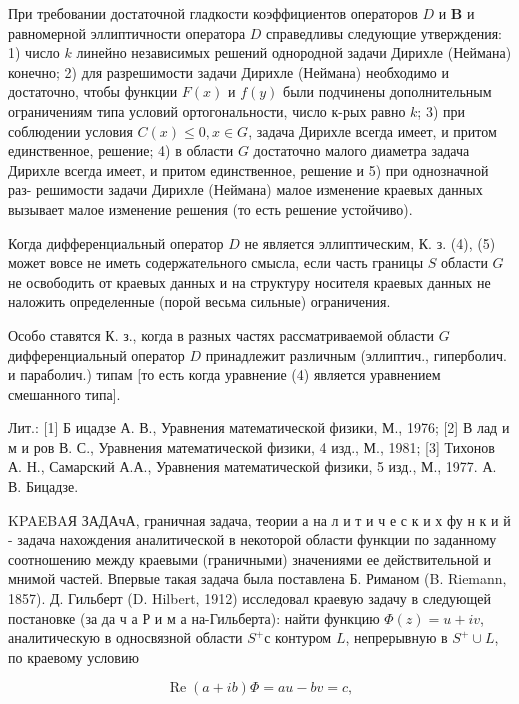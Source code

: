 \documentclass[10pt]{article}
\begin{document}
При требовании достаточной гладкости коэффициентов операторов $D$ и $\boldsymbol{B}$ и равномерной эллиптичности оператора $D$ справедливы следующие утверждения: 1) число $k$ линейно независимых решений однородной задачи Дирихле (Неймана) конечно; 2) для разрешимости задачи Дирихле (Неймана) необходимо и достаточно, чтобы функции $F(x)$ и $f(y)$ были подчинены дополнительным ограничениям типа условий ортогональности, число к-рых равно $k$; 3) при соблюдении условия $C(x) \leqslant 0, x \in G$, задача Дирихле всегда имеет, и притом единственное, решение; 4) в области $G$ достаточно малого диаметра задача Дирихле всегда имеет, и притом единственное, решение и 5) при однозначной раз- решимости задачи Дирихле (Неймана) малое изменение краевых данных вызывает малое изменение решения (то есть решение устойчиво).



Когда дифференциальный оператор $D$ не является эллиптическим, К. з. (4), (5) может вовсе не иметь содержательного смысла, если часть границы $S$ области $G$ не освободить от краевых данных и на структуру носителя краевых данных не наложить определенные (порой весьма сильные) ограничения.



Особо ставятся К. з., когда в разных частях рассматриваемой области $G$ дифференциальный оператор $D$ принадлежит различным (эллиптич., гиперболич. и параболич.) типам [то есть когда уравнение (4) является уравнением смешанного типа].



Лит.: [1] Б ицадзе А. В., Уравнения математической физики, М., 1976; [2] В лад и м и ров В. С., Уравнения математической физики, 4 изд., М., 1981; [3] Тихонов А. Н., Самарский А.А., Уравнения математической физики, 5 изд., М., 1977. А. В. Бицадзе.



KPAEBAЯ ЗАДАчА, граничная задача, теории а на л и т и ч е с к и х фу н к и й - задача нахождения аналитической в некоторой области функции по заданному соотношению между краевыми (граничными) значениями ее действительной и мнимой частей. Впервые такая задача была поставлена Б. Риманом (B. Riemann, 1857). Д. Гильберт (D. Hilbert, 1912) исследовал краевую задачу в следующей постановке (за да ч а Р и м а на-Гильберта): найти функцию $\Phi(z)=u+i v$, аналитическую в односвязной области $S^{+}$с контуром $L$, непрерывную в $S^{+} \cup L$, по краевому условию



\[

\operatorname{Re}(a+i b) \Phi=a u-b v=c,

\]
\end{document}
